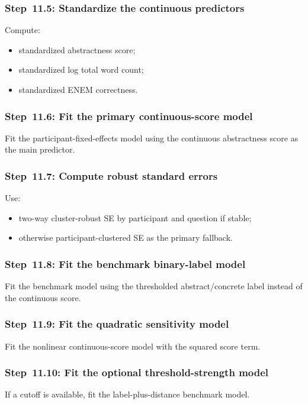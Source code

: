 \subsubsection{Step~11.5: Standardize the continuous predictors}
Compute:
\begin{itemize}
    \item standardized abstractness score;
    \item standardized log total word count;
    \item standardized ENEM correctness.
\end{itemize}

\subsubsection{Step~11.6: Fit the primary continuous-score model}
Fit the participant-fixed-effects model using the continuous abstractness score as the main predictor.

\subsubsection{Step~11.7: Compute robust standard errors}
Use:
\begin{itemize}
    \item two-way cluster-robust SE by participant and question if stable;
    \item otherwise participant-clustered SE as the primary fallback.
\end{itemize}

\subsubsection{Step~11.8: Fit the benchmark binary-label model}
Fit the benchmark model using the thresholded abstract/concrete label instead of the continuous score.

\subsubsection{Step~11.9: Fit the quadratic sensitivity model}
Fit the nonlinear continuous-score model with the squared score term.

\subsubsection{Step~11.10: Fit the optional threshold-strength model}
If a cutoff is available, fit the label-plus-distance benchmark model.

